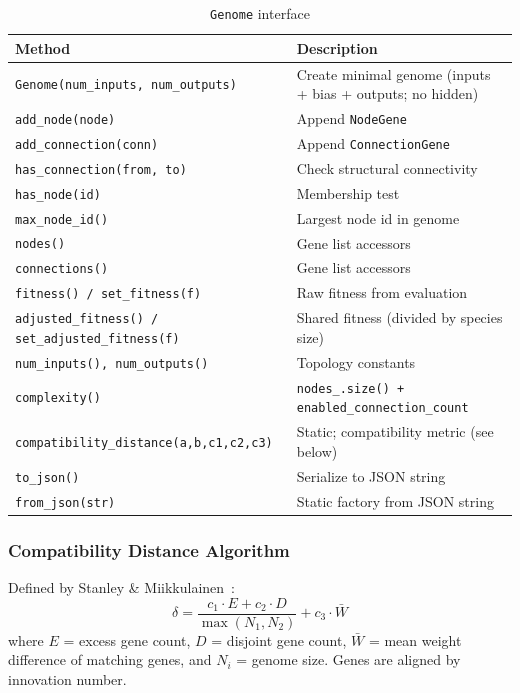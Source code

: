 \begin{table}[H]
\centering\small
\caption{\texttt{Genome} interface}
\begin{tabularx}{\textwidth}{@{}p{8.4cm}X@{}}
\toprule
\textbf{Method} & \textbf{Description} \\
\midrule
\texttt{Genome(num\_inputs, num\_outputs)} & Create minimal genome (inputs + bias + outputs; no hidden) \\
\texttt{add\_node(node)} & Append \texttt{NodeGene} \\
\texttt{add\_connection(conn)} & Append \texttt{ConnectionGene} \\
\texttt{has\_connection(from, to)} & Check structural connectivity \\
\texttt{has\_node(id)} & Membership test \\
\texttt{max\_node\_id()} & Largest node id in genome \\
\texttt{nodes()} & Gene list accessors \\
\texttt{connections()} & Gene list accessors \\
\texttt{fitness() / set\_fitness(f)} & Raw fitness from evaluation \\
\texttt{adjusted\_fitness() / set\_adjusted\_fitness(f)} & Shared fitness (divided by species size) \\
\texttt{num\_inputs(), num\_outputs()} & Topology constants \\
\texttt{complexity()} & \texttt{nodes\_.size() + enabled\_connection\_count} \\
\texttt{compatibility\_distance(a,b,c1,c2,c3)} & Static; compatibility metric (see below) \\
\texttt{to\_json()} & Serialize to JSON string \\
\texttt{from\_json(str)} & Static factory from JSON string \\
\bottomrule
\end{tabularx}
\end{table}

\subsubsection{Compatibility Distance Algorithm}

Defined by Stanley \& Miikkulainen~\cite{stanley2002}:
\[
  \delta = \frac{c_1 \cdot E + c_2 \cdot D}{\max(N_1, N_2)} + c_3 \cdot \bar{W}
\]
where $E$ = excess gene count, $D$ = disjoint gene count, $\bar{W}$ = mean weight
difference of matching genes, and $N_i$ = genome size.  Genes are aligned by innovation
number.

